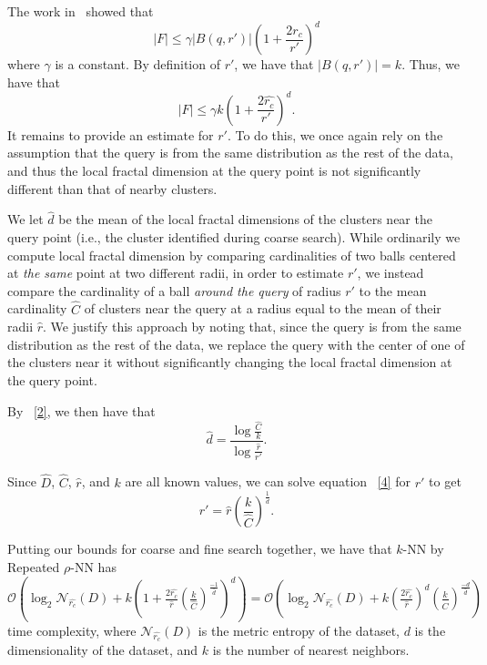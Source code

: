 The work in~\cite{yu2015entropy} showed that \begin{equation} |F| \leq \gamma |B(q, r')|\left(1+ \frac{2\hat{r_c}}{r'}\right)^d \label{3} \end{equation} where $\gamma$ is a constant. 
By definition of 
$r'$, we have that $|B(q, r')| = k$. Thus, we have that \begin{equation} |F| \leq \gamma k\left(1+ \frac{2\hat{r_c}}{r'}\right)^d. \label{4} \end{equation} It remains to provide an estimate for $r'$. 
To do this, we once again rely on the assumption that the query is from the same distribution as the rest of the data, 
and thus the local fractal dimension at the query point is not significantly different than that of nearby clusters.



We let $\hat{d}$ be the mean of the local fractal dimensions of the clusters near the query point (i.e., the cluster identified during coarse search).
While ordinarily we compute local fractal dimension 
by comparing cardinalities of two balls centered at \emph{the same} point at two different radii, in order to estimate $r'$, 
we instead compare the cardinality of a ball \emph{around the query} of radius $r'$ to the mean cardinality $\hat{C}$ of clusters near the query 
at a radius equal to the mean of their radii $\hat{r}$.
We justify this approach by noting that, since the query is from the same distribution as the rest of the data, we replace the query with 
the center of one of the clusters near it without significantly changing the local fractal dimension at the query point. 


By ~\ref{2}, we then have that \begin{equation} \hat{d} = \frac{\log{}\frac{\hat{C}}{k}}{\log{}\frac{\hat{r}}{r'}}. \label{5} \end{equation}

Since $\hat{D}$, $\hat{C}$, $\hat{r}$, and $k$ are all known values, we can solve equation ~\ref{4} for $r'$ to get
\begin{equation} r' = \hat{r}\left(\frac{k}{\hat{C}}\right)^{\frac{1}{\hat{d}}}. \label{6} \end{equation}
    
Putting our bounds for coarse and fine search together, we have that $k$-NN by Repeated $\rho$-NN has 
$\mathcal{O}\left(\log_2{\mathcal{N}_{\hat{r_c}}(D)} + k\left(1+ \frac{2\hat{r_c}}{\hat{r}}\left(\frac{k}{\hat{C}}\right)^{\frac{-1}{\hat{d}}}\right)^d\right) = 
\mathcal{O}\left(\log_2{\mathcal{N}_{\hat{r_c}}(D)} + k\left(\frac{2\hat{r_c}}{\hat{r}}\right)^d\left(\frac{k}{\hat{C}}\right)^{\frac{-d}{\hat{d}}}\right)$ 
time complexity, where $\mathcal{N}_{\hat{r_c}}(D)$ is the metric entropy of the dataset, $d$ is the dimensionality of the dataset, and $k$ is the number of nearest neighbors. 

